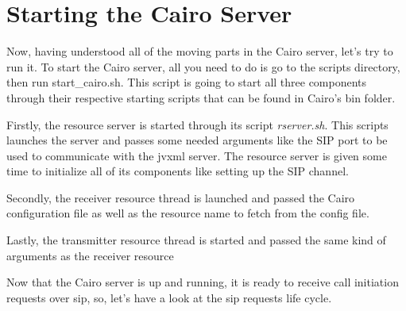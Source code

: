 \section{Starting the Cairo Server}
Now, having understood all of the moving parts in the Cairo server, let's try to run it.
To start the Cairo server, all you need to do is go to the scripts directory, then run start\_cairo.sh.
This script is going to start all three components through their respective starting scripts that can be found in Cairo's bin folder.

Firstly, the resource server is started through its script \textit{rserver.sh}.
This scripts launches the server and passes some needed arguments like the SIP port to be used to communicate with the \ac{jvxml} server.
The resource server is given some time to initialize all of its components like setting up the SIP channel.

Secondly, the receiver resource thread is launched and passed the Cairo configuration file as well as the resource name to fetch from the config file.

Lastly, the transmitter resource thread is started and passed the same kind of arguments as the receiver resource

Now that the Cairo server is up and running, it is ready to receive call initiation requests over \ac{sip}, so, let's have a look at the \ac{sip} requests life cycle.


